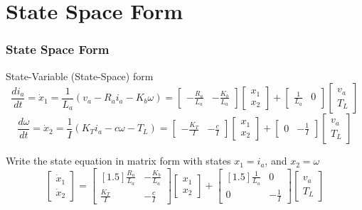 \documentclass{beamer}                  %
\newcommand{\sectiontitleIII}{State Space Form}
\begin{document}
	\section{\sectiontitleIII}

	\begin{frame} \small
		\frametitle{\sectiontitleIII}

		State-Variable (State-Space) form
		\[\renewcommand*{\arraystretch}{1.5}
		  \frac{di_a}{dt}=\dot{x}_1=\frac{1}{L_a}\left( v_a -R_ai_a-K_b\omega\right)
		  = \begin{bmatrix} -\frac{R_a}{L_a} & -\frac{K_b}{L_a} \end{bmatrix}
		  \begin{bmatrix} x_1 \\ x_2 \end{bmatrix}
		  +\begin{bmatrix} \frac{1}{L_a} & 0 \end{bmatrix}
		  \begin{bmatrix} v_a \\ T_L \end{bmatrix}
		\]
		\[
		  \frac{d\omega}{dt}=\dot{x}_2=\frac{1}{I}\left( K_Ti_a-c\omega-T_L\right)	
		  = \begin{bmatrix} -\frac{K_T}{I} & -\frac{c}{I} \end{bmatrix}
		  \begin{bmatrix} x_1 \\ x_2 \end{bmatrix}
		  +\begin{bmatrix} 0 & -\frac{1}{I} \end{bmatrix}
		  \begin{bmatrix} v_a \\ T_L \end{bmatrix}
		\]

		Write the state equation in matrix form with states $x_1=i_a$, and $x_2=\omega$
		\[
		  \begin{bmatrix}\dot{x}_1 \\ \dot{x}_2\end{bmatrix} 
		  =\begin{bmatrix}[1.5] \frac{R_a}{L_a} & -\frac{K_b}{L_a} \\ \frac{K_T}{I} & -\frac{c}{I}\end{bmatrix}
		  \begin{bmatrix} x_1 \\ x_2\end{bmatrix}
		  +\begin{bmatrix}[1.5] \frac{1}{L_a} & 0 \\ 0 & -\frac{1}{I}\end{bmatrix}
		  \begin{bmatrix}v_a \\T_L \end{bmatrix}
        \]

	\end{frame}	
\end{document}
